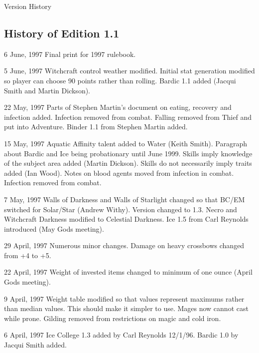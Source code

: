 \begin{Chapter}{Version History}
\subsection{History of Edition 1.1}

\begin{Description}

\item[6 June, 1997] Final print for 1997 rulebook. 

\item[5 June, 1997] Witchcraft control weather modified.  Initial stat
  generation modified so player can choose 90 points rather than
  rolling.  Bardic 1.1 added (Jacqui Smith and Martin Dickson).

\item[22 May, 1997] Parts of Stephen Martin’s document on eating,
  recovery and infection added.  Infection removed from combat.
  Falling removed from Thief and put into Adventure.  Binder 1.1 from
  Stephen Martin added.

\item[15 May, 1997] Aquatic Affinity talent added to Water (Keith
  Smith).  Paragraph about Bardic and Ice being probationary until
  June 1999.  Skills imply knowledge of the subject area added (Martin
  Dickson).  Skills do not necessarily imply traits added (Ian Wood).
  Notes on blood agents moved from infection in combat. Infection
  removed from combat.

\item[7 May, 1997] Walls of Darkness and Walls of Starlight changed so
  that BC/EM switched for Solar/Star (Andrew Withy).  Version changed
  to 1.3.  Necro and Witchcraft Darkness modified to Celestial
  Darkness.  Ice 1.5 from Carl Reynolds introduced (May Gods
  meeting).

\item[29 April, 1997] Numerous minor changes. Damage on heavy
  crossbows changed from +4 to +5.

\item[22 April, 1997] Weight of invested items changed to minimum of
  one ounce (April Gods meeting).

\item[9 April, 1997] Weight table modified so that values represent
  maximums rather than median values.  This should make it simpler to
  use.  Mages now cannot cast while prone.  Gilding removed from
  restrictions on magic and cold iron.

\item[6 April, 1997] Ice College 1.3 added by Carl Reynolds
  12/1/96. Bardic 1.0 by Jacqui Smith added.


\end{Description}
\end{Chapter}
